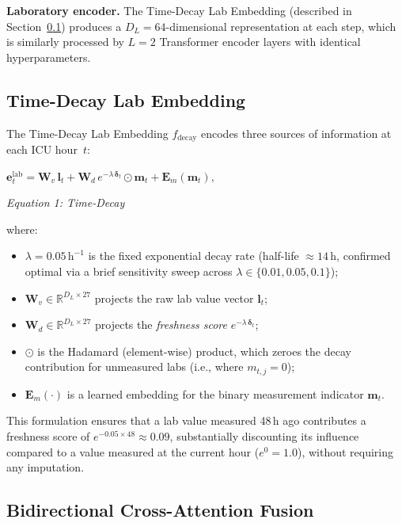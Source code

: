 \documentclass[conference,12pt]{IEEEtran}
\newcommand{\sect}[1]{Section~\ref{#1}}
\begin{document}
\textbf{Laboratory encoder.}
The Time-Decay Lab Embedding (described in \sect{sec:tdecay}) produces a
$D_L = 64$-dimensional representation at each step, which is similarly processed
by $L = 2$ Transformer encoder layers with identical hyperparameters.

\subsection{\textbf{Time-Decay Lab Embedding}}
\label{sec:tdecay}

The Time-Decay Lab Embedding $f_{\mathrm{decay}}$ encodes three sources of
information at each ICU hour~$t$:
%
\vspace{1em}
\begin{center}
  $\displaystyle
  \boxed{
  \mathbf{e}^{\mathrm{lab}}_{t}
    = \mathbf{W}_v\,\mathbf{l}_t
      + \mathbf{W}_d\,e^{-\lambda\,\boldsymbol{\delta}_t} \odot \mathbf{m}_t
      + \mathbf{E}_m(\mathbf{m}_t),
  }
  $
  \vspace{0.5em}
  
  \textit{Equation 1: Time-Decay}
\end{center}
\vspace{1em}
%
where:
\begin{itemize}
  \item $\lambda = 0.05\,\mathrm{h}^{-1}$ is the fixed exponential decay rate
        (half-life $\approx 14$\,h, confirmed optimal via a brief sensitivity sweep across $\lambda \in \{0.01, 0.05, 0.1\}$);
  \item $\mathbf{W}_v \in \mathbb{R}^{D_L \times 27}$ projects the raw lab
        value vector $\mathbf{l}_t$;
  \item $\mathbf{W}_d \in \mathbb{R}^{D_L \times 27}$ projects the
        \emph{freshness score} $e^{-\lambda\,\boldsymbol{\delta}_t}$;
  \item $\odot$ is the Hadamard (element-wise) product, which zeroes the
        decay contribution for unmeasured labs (i.e., where $m_{t,j} = 0$);
  \item $\mathbf{E}_m(\cdot)$ is a learned embedding for the binary
        measurement indicator $\mathbf{m}_t$.
\end{itemize}
%
This formulation ensures that a lab value measured 48\,h ago contributes a
freshness score of $e^{-0.05 \times 48} \approx 0.09$, substantially
discounting its influence compared to a value measured at the current hour
($e^{0} = 1.0$), without requiring any imputation.

\subsection{\textbf{Bidirectional Cross-Attention Fusion}}
\label{sec:fusion}
\end{document}
